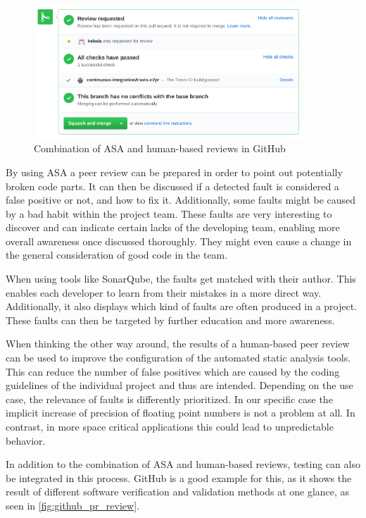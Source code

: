 \documentclass{scrreprt}
\begin{document}
\begin{figure}[h]
	\centering
	\includegraphics[width=0.9\textwidth]{img/github_pr_review}
	\caption[GitHub PR review]{Combination of ASA and human-based reviews in GitHub}
	\label{fig:github_pr_review}
\end{figure}

By using ASA a peer review can be prepared in order to point out potentially broken code parts. It can then be discussed if a detected fault is considered a false positive or not, and how to fix it. Additionally, some faults might be caused by a bad habit within the project team. These faults are very interesting to discover and can indicate certain lacks of the developing team, enabling more overall awareness once discussed thoroughly. They might even cause a change in the general consideration of good code in the team.  

When using tools like SonarQube, the faults get matched with their author. This enables each developer to learn from their mistakes in a more direct way. Additionally, it also displays which kind of faults are often produced in a project. These faults can then be targeted by further education and more awareness.

When thinking the other way around, the results of a human-based peer review can be used to improve the configuration of the automated static analysis tools. This can reduce the number of false positives which are caused by the coding guidelines of the individual project and thus are intended.
Depending on the use case, the relevance of faults is differently prioritized. In our specific case the implicit increase of precision of floating point numbers is not a problem at all. In contrast, in more space critical applications this could lead to unpredictable behavior.

In addition to the combination of ASA and human-based reviews, testing can also be integrated in this process. GitHub is a good example for this, as it shows the result of different software verification and validation methods at one glance, as seen in \vref{fig:github_pr_review}.
\end{document}
